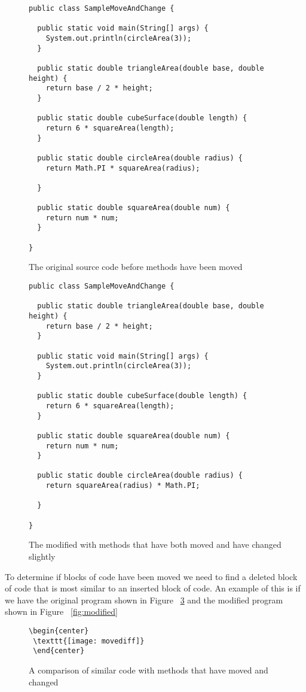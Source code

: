 \begin{figure}[!t]
\begin{lstlisting}
public class SampleMoveAndChange {

  public static void main(String[] args) {
    System.out.println(circleArea(3));
  }

  public static double triangleArea(double base, double height) {
    return base / 2 * height;
  }

  public static double cubeSurface(double length) {
    return 6 * squareArea(length);
  }

  public static double circleArea(double radius) {
    return Math.PI * squareArea(radius);

  }

  public static double squareArea(double num) {
    return num * num;
  }

}
\end{lstlisting}
\caption{The original source code before methods have been moved}
 \label{fig:orig}
\end{figure}

\begin{figure}[!t]
\begin{lstlisting}
public class SampleMoveAndChange {

  public static double triangleArea(double base, double height) {
    return base / 2 * height;
  }

  public static void main(String[] args) {
    System.out.println(circleArea(3));
  }

  public static double cubeSurface(double length) {
    return 6 * squareArea(length);
  }

  public static double squareArea(double num) {
    return num * num;
  }

  public static double circleArea(double radius) {
    return squareArea(radius) * Math.PI;

  }

}
\end{lstlisting}
\caption{The modified with methods that have both moved and have changed slightly}
 \label{fig:orig}
\end{figure}


To determine if blocks of code have been moved we need to find a deleted block of code that is most similar to an inserted block of code.  An example of this is if we have the original program shown in Figure ~\ref{fig:orig} and the modified program shown in Figure ~\ref{fig:modified}

\begin{figure}[!t]
\begin{lstlisting}
\begin{center}
 \texttt{[image: movediff]}
 \end{center}
\end{lstlisting}
\caption{A comparison of similar code with methods that have moved and changed}
 \label{fig:orig}
\end{figure}


